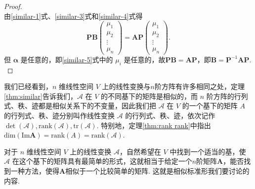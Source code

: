 \documentclass[12pt, a4paper,newtx]{ctexart}
\begin{document}
\begin{proof}
\begin{equation}
	\end{equation}
	由\eqref{similar-1}式、\eqref{similar-3}式和\eqref{similar-4}式得\begin{equation}\label{similar-5}
		\bm{PB} \begin{pmatrix} \mu_1 \\ \mu_2 \\ \vdots \\ \mu_n \end{pmatrix} = \bm{AP} \begin{pmatrix} \mu_1 \\ \mu_2 \\ \vdots \\ \mu_n \end{pmatrix}.
	\end{equation}
	但 $ \bm\alpha $ 是任意的，即\eqref{similar-5}式中的 $ \mu_i $ 是任意的，故$\bm{PB}=\bm{AP}$，即$\bm B = \bm P^{-1}\bm{AP}.$
\end{proof}
我们已经看到，$ n $ 维线性空间 $ V $ 上的线性变换与$n$阶方阵有许多相同之处，定理\ref{thm:similar}告诉我们，$ \mathcal{A} $ 在 $ V $ 的不同基下的矩阵是相似的，而 $ n $ 阶方阵的行列式、秩、迹都是相似关系下的不变量，因此我们把 $ \mathcal{A} $ 在 $ V $ 的一个基下的矩阵 $ A $ 的行列式、秩、迹分别叫作线性变换 $ \mathcal{A} $ 的行列式、秩、迹，依次记作 $ \det(\mathcal{A}), \text{rank}(\mathcal{A}), \text{tr}(\mathcal{A}) $. 特别地，定理\ref{thm:rank rank}中指出$ \text{dim}(\text{Im}\mathcal{\bm A}) = \text{rank}(A)=\mathrm{rank}(\mathcal A)$. 

对于 $ n $ 维线性空间 $ V $ 上的线性变换 $ \mathcal{A} $，自然希望在 $ V $ 中找到一个适当的基，使 $ \mathcal{A} $ 在这个基下的矩阵具有最简单的形式，这就相当于给定一个$n$阶矩阵$\bm A$，能否找到一种方法，使得$\bm A$相似于一个比较简单的矩阵. 这就是相似标准形我们要讨论的内容. 
\end{document}
